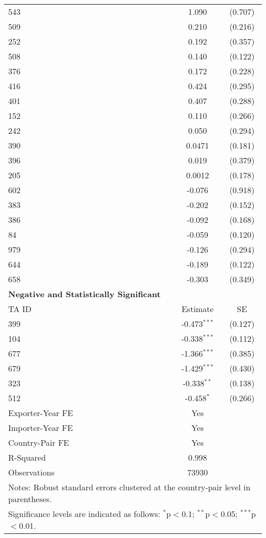 \begin{center}
\begin{longtable}{lcc}
    543 & 1.090 & (0.707) \\
    509 & 0.210 & (0.216) \\
    252 & 0.192 & (0.357) \\
    508 & 0.140 & (0.122) \\
    376 & 0.172 & (0.228) \\
    416 & 0.424 & (0.295) \\
    401 & 0.407 & (0.288) \\
    152 & 0.110 & (0.266) \\
    242 & 0.050 & (0.294) \\
    390 & 0.0471 & (0.181) \\
    396 & 0.019 & (0.379) \\
    205 & 0.0012 & (0.178) \\
    602 & -0.076 & (0.918) \\
    383 & -0.202 & (0.152) \\
    386 & -0.092 & (0.168) \\
    84  & -0.059 & (0.120) \\
    979  & -0.126 & (0.294) \\
    644  & -0.189 & (0.122) \\
    658  & -0.303 & (0.349) \\
    \hline
    \textbf{Negative and Statistically Significant} &  &  \\
    \hline
    TA ID & Estimate & SE \\
    \hline
    399 & -0.473$^{\ast\ast\ast}$ & (0.127) \\
    104 & -0.338$^{\ast\ast\ast}$ & (0.112) \\
    677 & -1.366$^{\ast\ast\ast}$ & (0.385) \\
    679 & -1.429$^{\ast\ast\ast}$ & (0.430) \\
    323 & -0.338$^{\ast\ast}$ & (0.138) \\
    512 & -0.458$^{\ast}$ & (0.266) \\
    \hline
    Exporter-Year FE & Yes \\
    Importer-Year FE & Yes \\
    Country-Pair FE & Yes \\
    R-Squared & 0.998 \\
    Observations & 73930 \\
    \hline
    \multicolumn{3}{l}{\footnotesize{Notes: Robust standard errors clustered at the country-pair level in parentheses.}} \\
    \multicolumn{3}{l}{\footnotesize{Significance levels are indicated as follows: $^{\ast}$p$<$0.1; $^{\ast\ast}$p$<$0.05; $^{\ast\ast\ast}$p$<$0.01.}} \\
\end{longtable}
\end{center}


